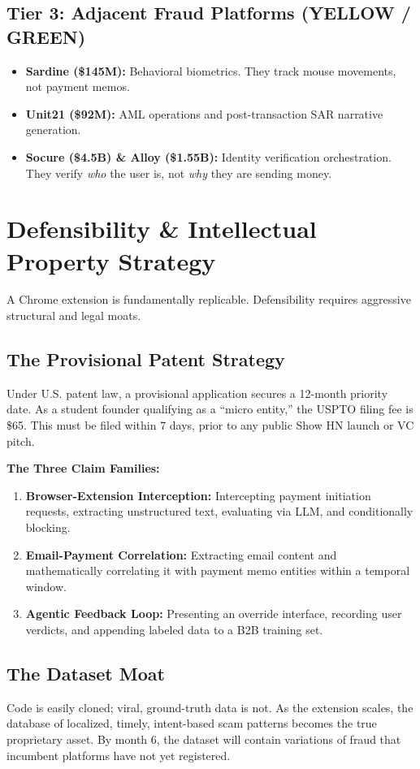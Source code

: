 \documentclass[12pt, letterpaper]{article}
\begin{document}
\subsection{Tier 3: Adjacent Fraud Platforms (YELLOW / GREEN)}
\begin{itemize}
    \item \textbf{Sardine (\$145M):} Behavioral biometrics. They track mouse movements, not payment memos.
    \item \textbf{Unit21 (\$92M):} AML operations and post-transaction SAR narrative generation.
    \item \textbf{Socure (\$4.5B) \& Alloy (\$1.55B):} Identity verification orchestration. They verify \textit{who} the user is, not \textit{why} they are sending money.
\end{itemize}

\newpage
\section{Defensibility \& Intellectual Property Strategy}

A Chrome extension is fundamentally replicable. Defensibility requires aggressive structural and legal moats.

\subsection{The Provisional Patent Strategy}
Under U.S. patent law, a provisional application secures a 12-month priority date. As a student founder qualifying as a ``micro entity,'' the USPTO filing fee is \$65. This must be filed within 7 days, prior to any public Show HN launch or VC pitch. 

\textbf{The Three Claim Families:}
\begin{enumerate}
    \item \textbf{Browser-Extension Interception:} Intercepting payment initiation requests, extracting unstructured text, evaluating via LLM, and conditionally blocking.
    \item \textbf{Email-Payment Correlation:} Extracting email content and mathematically correlating it with payment memo entities within a temporal window.
    \item \textbf{Agentic Feedback Loop:} Presenting an override interface, recording user verdicts, and appending labeled data to a B2B training set.
\end{enumerate}

\subsection{The Dataset Moat}
Code is easily cloned; viral, ground-truth data is not. As the extension scales, the database of localized, timely, intent-based scam patterns becomes the true proprietary asset. By month 6, the dataset will contain variations of fraud that incumbent platforms have not yet registered.
\end{document}
